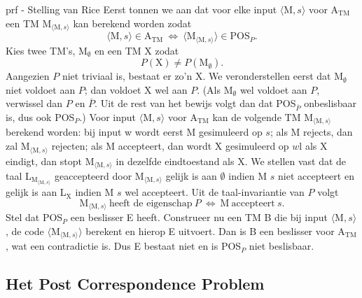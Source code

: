 \begin{prf}{prf - Stelling van Rice}
    Eerst tonnen we aan dat voor elke input $\langle \text{M}, s \rangle$ voor $\text{A}_{\text{TM}}$ een TM $\text{M}_{\langle \text{M}, s \rangle}$ kan berekend worden zodat
    \begin{equation*}
        \langle \text{M}, s \rangle \in \text{A}_{\text{TM}} 
        \ \Leftrightarrow \
        \langle \text{M}_{\langle \text{M}, s \rangle} \rangle \in \text{POS}_P.
    \end{equation*}
    Kies twee TM's, M$_{\emptyset}$ en een TM X zodat 
    \begin{equation*}
        P(\text{X}) \neq P(\text{M}_{\emptyset}).
    \end{equation*}
    Aangezien $P$ niet triviaal is, bestaat er zo'n X. We veronderstellen eerst dat M$_{\emptyset}$ niet voldoet aan $P$; dan voldoet X wel aan $P$. (Als M$_{\emptyset}$ wel voldoet aan $P$, verwissel dan $P$ en $\overline{P}$. Uit de rest van het bewijs volgt dan dat POS$_{\overline{P}}$ onbeslisbaar is, dus ook POS$_P$.) Voor input $\langle \text{M}, s \rangle$ voor A$_{\text{TM}}$ kan de volgende TM M$_{\langle \text{M}, s \rangle}$ berekend worden: bij input w wordt eerst M gesimuleerd op $s$; als M rejects, dan zal M$_{\langle \text{M}, s \rangle}$ rejecten; als M accepteert, dan wordt X gesimuleerd op $w$l als X eindigt, dan stopt M$_{\langle \text{M}, s \rangle}$ in dezelfde eindtoestand als X. We stellen vast dat de taal L$_{\text{M}_{\langle \text{M}, s \rangle}}$ geaccepteerd door M$_{\langle \text{M}, s \rangle}$ gelijk is aan $\emptyset$ indien M $s$ niet accepteert en gelijk is aan L$_{\text{X}}$ indien M $s$ wel accepteert. Uit de taal-invariantie van $P$ volgt 
    \begin{equation*}
        \text{M}_{\langle \text{M}, s \rangle} \ \text{heeft de eigenschap} \ P
        \ \Leftrightarrow \ 
        \text{M} \ \text{accepteert} \ s.
    \end{equation*}
    Stel dat POS$_P$ een beslisser E heeft. Construeer nu een TM B die bij input $\langle \text{M}, s \rangle$, de code $\langle \text{M}_{\langle \text{M}, s \rangle} \rangle$ berekent en hierop E uitvoert. Dan is B een beslisser voor A$_{\text{TM}}$, wat een contradictie is. Dus E bestaat niet en is POS$_P$ niet beslisbaar.
\end{prf}

\subsection{Het Post Correspondence Problem}

